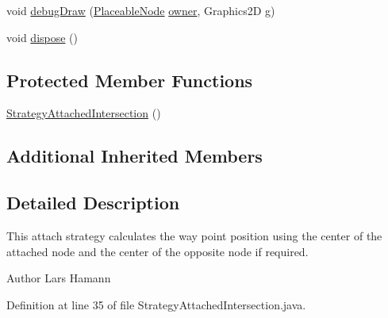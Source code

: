 \begin{DoxyCompactItemize}
\item 
void \hyperlink{classorg_1_1tzi_1_1use_1_1gui_1_1views_1_1diagrams_1_1elements_1_1positioning_1_1_strategy_attached_intersection_a0d9123e1d4fa58640e4808ad1bc5d5d5}{debug\-Draw} (\hyperlink{classorg_1_1tzi_1_1use_1_1gui_1_1views_1_1diagrams_1_1elements_1_1_placeable_node}{Placeable\-Node} \hyperlink{classorg_1_1tzi_1_1use_1_1gui_1_1views_1_1diagrams_1_1elements_1_1positioning_1_1_statefull_position_strategy_ac987ea0c7e5b6ddc09cc5afb41043dfd}{owner}, Graphics2\-D g)
\item 
void \hyperlink{classorg_1_1tzi_1_1use_1_1gui_1_1views_1_1diagrams_1_1elements_1_1positioning_1_1_strategy_attached_intersection_aaf3c06633678c405a097763ff2d4d152}{dispose} ()
\end{DoxyCompactItemize}
\subsection*{Protected Member Functions}
\begin{DoxyCompactItemize}
\item 
\hyperlink{classorg_1_1tzi_1_1use_1_1gui_1_1views_1_1diagrams_1_1elements_1_1positioning_1_1_strategy_attached_intersection_a5faab2942fdf90c791743c13cea38827}{Strategy\-Attached\-Intersection} ()
\end{DoxyCompactItemize}
\subsection*{Additional Inherited Members}


\subsection{Detailed Description}
This attach strategy calculates the way point position using the center of the attached node and the center of the opposite node if required. \begin{DoxyAuthor}{Author}
Lars Hamann 
\end{DoxyAuthor}


Definition at line 35 of file Strategy\-Attached\-Intersection.\-java.



